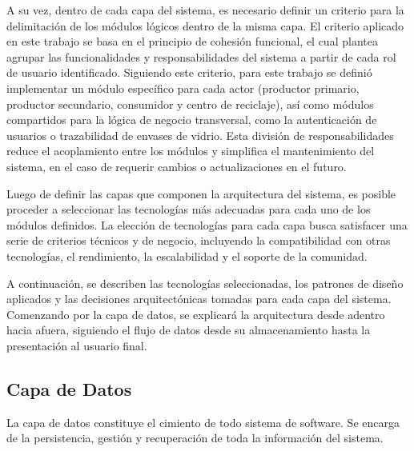 A su vez, dentro de cada capa del sistema, es necesario definir un criterio para la delimitación de los módulos lógicos dentro de la misma capa. El criterio aplicado en este trabajo se basa en el principio de cohesión funcional, el cual plantea agrupar las funcionalidades y responsabilidades del sistema a partir de cada rol de usuario identificado. Siguiendo este criterio, para este trabajo se definió implementar un módulo específico para cada actor (productor primario, productor secundario, consumidor y centro de reciclaje), así como módulos compartidos para la lógica de negocio transversal, como la autenticación de usuarios o trazabilidad de envases de vidrio. Esta división de responsabilidades reduce el acoplamiento entre los módulos y simplifica el mantenimiento del sistema, en el caso de requerir cambios o actualizaciones en el futuro.

Luego de definir las capas que componen la arquitectura del sistema, es posible proceder a seleccionar las tecnologías más adecuadas para cada uno de los módulos definidos. La elección de tecnologías para cada capa busca satisfacer una serie de criterios técnicos y de negocio, incluyendo la compatibilidad con otras tecnologías, el rendimiento, la escalabilidad y el soporte de la comunidad. 

A continuación, se describen las tecnologías seleccionadas, los patrones de diseño aplicados y las decisiones arquitectónicas tomadas para cada capa del sistema. Comenzando por la capa de datos, se explicará la arquitectura desde adentro hacia afuera, siguiendo el flujo de datos desde su almacenamiento hasta la presentación al usuario final.

\subsection{Capa de Datos}

La capa de datos constituye el cimiento de todo sistema de software. Se encarga de la persistencia, gestión y recuperación de toda la información del sistema. 

